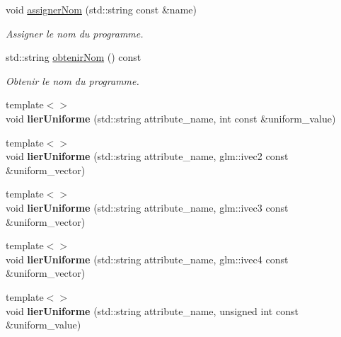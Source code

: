 \begin{DoxyCompactItemize}
void \hyperlink{classopengl_1_1_programme_a2c73542b27eb1f64e531bd3958f1136e}{assigner\+Nom} (std\+::string const \&name)
\begin{DoxyCompactList}\small\item\em Assigner le nom du programme. \end{DoxyCompactList}\item 
std\+::string \hyperlink{classopengl_1_1_programme_a4cd2ed060a3f5292a66b2f72b824fae0}{obtenir\+Nom} () const 
\begin{DoxyCompactList}\small\item\em Obtenir le nom du programme. \end{DoxyCompactList}\item 
\hypertarget{classopengl_1_1_programme_a44339c65c2631808dad3ceca8a408b34}{}{\footnotesize template$<$$>$ }\\void {\bfseries lier\+Uniforme} (std\+::string attribute\+\_\+name, int const \&uniform\+\_\+value)\label{classopengl_1_1_programme_a44339c65c2631808dad3ceca8a408b34}

\item 
\hypertarget{classopengl_1_1_programme_ac5b182663b87bbb6a48729210d631799}{}{\footnotesize template$<$$>$ }\\void {\bfseries lier\+Uniforme} (std\+::string attribute\+\_\+name, glm\+::ivec2 const \&uniform\+\_\+vector)\label{classopengl_1_1_programme_ac5b182663b87bbb6a48729210d631799}

\item 
\hypertarget{classopengl_1_1_programme_a97b1ad59c84d69115123d0498bc8d3e2}{}{\footnotesize template$<$$>$ }\\void {\bfseries lier\+Uniforme} (std\+::string attribute\+\_\+name, glm\+::ivec3 const \&uniform\+\_\+vector)\label{classopengl_1_1_programme_a97b1ad59c84d69115123d0498bc8d3e2}

\item 
\hypertarget{classopengl_1_1_programme_a98c9edec2b175e3fe8de093771a90c10}{}{\footnotesize template$<$$>$ }\\void {\bfseries lier\+Uniforme} (std\+::string attribute\+\_\+name, glm\+::ivec4 const \&uniform\+\_\+vector)\label{classopengl_1_1_programme_a98c9edec2b175e3fe8de093771a90c10}

\item 
\hypertarget{classopengl_1_1_programme_ac8e745156456250a160e10097a67c18a}{}{\footnotesize template$<$$>$ }\\void {\bfseries lier\+Uniforme} (std\+::string attribute\+\_\+name, unsigned int const \&uniform\+\_\+value)\label{classopengl_1_1_programme_ac8e745156456250a160e10097a67c18a}


\end{DoxyCompactItemize}
